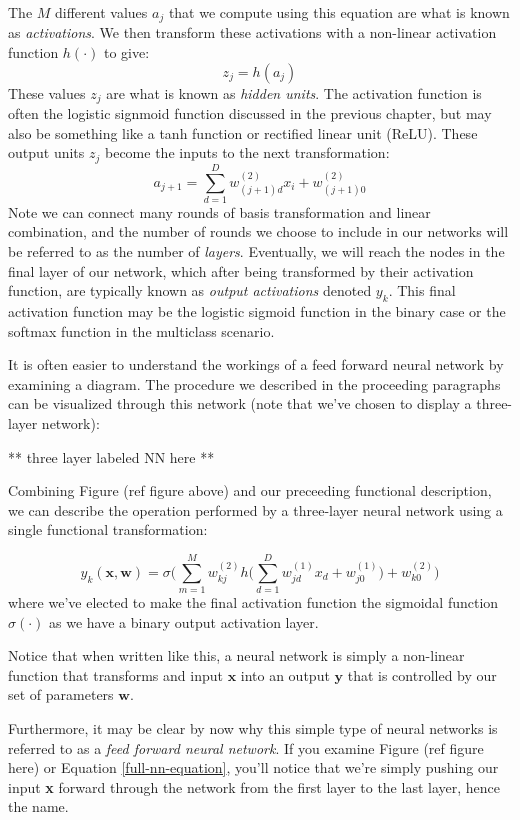 The $M$ different values $a_{j}$ that we compute using this equation are what is known as \textit{activations}. We then transform these activations with a non-linear activation function $h(\cdot)$ to give:
\begin{equation} \label{basic-nn-z-outputs}
	z_{j} = h(a_{j})
\end{equation}
These values $z_{j}$ are what is known as \textit{hidden units}. The activation function is often the logistic signmoid function discussed in the previous chapter, but may also be something like a tanh function or rectified linear unit (ReLU). These output units $z_{j}$ become the inputs to the next transformation:
\begin{equation} \label{basic-nn-form-next-layer}
	a_{j+1} = \sum_{d=1}^{D} w_{(j+1)d}^{(2)} x_{i} + w_{(j+1)0}^{(2)}
\end{equation}
Note we can connect many rounds of basis transformation and linear combination, and the number of rounds we choose to include in our networks will be referred to as the number of \textit{layers}. Eventually, we will reach the nodes in the final layer of our network, which after being transformed by their activation function, are typically known as \textit{output activations} denoted $y_{k}$. This final activation function may be the logistic sigmoid function in the binary case or the softmax function in the multiclass scenario.

It is often easier to understand the workings of a feed forward neural network by examining a diagram. The procedure we described in the proceeding paragraphs can be visualized through this network (note that we've chosen to display a three-layer network):

** three layer labeled NN here **

Combining Figure (ref figure above) and our preceeding functional description, we can describe the operation performed by a three-layer neural network using a single functional transformation:

\begin{equation} \label{full-nn-equation}
	y_{k}(\textbf{x}, \textbf{w}) = \sigma\bigg(\sum_{m=1}^{M}w_{kj}^{(2)} h\bigg(\sum_{d=1}^{D}w_{jd}^{(1)}x_{d} + w_{j0}^{(1)}\bigg) + w_{k0}^{(2)}\bigg)
\end{equation}
where we've elected to make the final activation function the sigmoidal function $\sigma(\cdot)$ as we have a binary output activation layer.

Notice that when written like this, a neural network is simply a non-linear function that transforms and input $\textbf{x}$ into an output $\textbf{y}$ that is controlled by our set of parameters $\textbf{w}$.

Furthermore, it may be clear by now why this simple type of neural networks is referred to as a \textit{feed forward neural network}. If you examine Figure (ref figure here) or Equation \ref{full-nn-equation}, you'll notice that we're simply pushing our input \textbf{x} forward through the network from the first layer to the last layer, hence the name.







